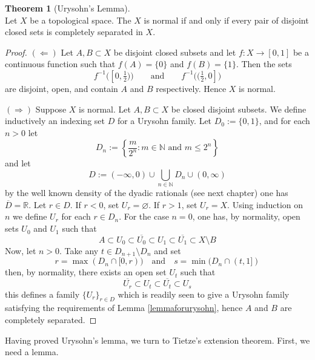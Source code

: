 \documentclass{book}
\theoremstyle{definition}
\newtheorem{theorem}{Theorem}[section]
\theoremstyle{remark}
\newcommand{\R}{\mathbb{R}}
\newcommand{\N}{\mathbb{N}}
\begin{document}
\begin{theorem}[Urysohn's Lemma]$ $\\
Let $X$ be a topological space. The $X$ is normal if and only if every pair of disjoint closed sets is completely separated in $X$.
\end{theorem}
\begin{proof}
$(\Leftarrow)$ Let $A,B\subset X$ be disjoint closed subsets and let $f:X\to[0,1]$ be a continuous function such that $f(A)=\{0\}$ and $f(B)=\{1\}$. Then the sets
$$f^{-1}\big([0,\tfrac{1}{2})\big)\qquad\text{and}\qquad f^{-1}\big((\tfrac{1}{2},0]\big)$$
are disjoint, open, and contain $A$ and $B$ respectively. Hence $X$ is normal.

$(\Rightarrow)$ Suppose $X$ is normal. Let $A,B\subset X$ be closed disjoint subsets. We define inductively an indexing set $D$ for a Urysohn family. Let $D_0:=\{0,1\}$, and for each $n>0$ let
$$D_n:=\left\{\frac{m}{2^n}:m\in\N\text{ and }m\leq 2^n\right\}$$
and let
$$D:=(-\infty,0)\cup\bigcup_{n\in\N} D_n\cup (0,\infty)$$
by the well known density of the dyadic rationals (see next chapter) one has $\overline D=\R$. Let $r\in D$. If $r<0$, set $U_r=\varnothing$. If $r>1$, set $U_r=X$. Using induction on $n$ we define $U_r$ for each $r\in D_n$. For the case $n=0$, one has, by normality, open sets $U_0$ and $U_1$ such that
$$A\subset U_0\subset\overline {U_0}\subset U_1\subset\overline{U_1}\subset X\setminus B$$
Now, let $n>0$. Take any $t\in D_{n+1}\setminus D_n$ and set 
$$r=\max(D_n\cap [0,r))\quad\text{and}\quad s=\min(D_n\cap (t,1])$$
then, by normality, there exists an open set $U_t$ such that
$$\overline {U_r}\subset U_t\subset\overline{U_t}\subset U_s$$
this defines a family $\{U_r\}_{r\in D}$ which is readily seen to give a Urysohn family satisfying the requirements of Lemma \ref{lemmaforurysohn}, hence $A$ and $B$ are completely separated.
\end{proof}

Having proved Urysohn's lemma, we turn to Tietze's extension theorem. First, we need a lemma.
\end{document}
